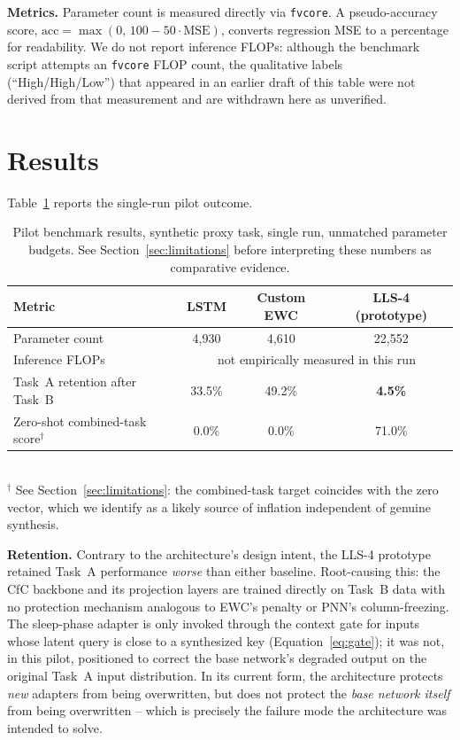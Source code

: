 \documentclass[11pt]{article}
\begin{document}
\textbf{Metrics.} Parameter count is measured directly via \texttt{fvcore}. A pseudo-accuracy score, $\mathrm{acc} = \max(0,\, 100 - 50 \cdot \mathrm{MSE})$, converts regression MSE to a percentage for readability. We do not report inference FLOPs: although the benchmark script attempts an \texttt{fvcore} FLOP count, the qualitative labels (``High/High/Low'') that appeared in an earlier draft of this table were not derived from that measurement and are withdrawn here as unverified.

\section{Results}
\label{sec:results}

Table~\ref{tab:results} reports the single-run pilot outcome.

\begin{table}[htbp]
\centering
\caption{Pilot benchmark results, synthetic proxy task, single run, unmatched parameter budgets. See Section~\ref{sec:limitations} before interpreting these numbers as comparative evidence.}
\label{tab:results}
\begin{tabular}{lccc}
\toprule
\textbf{Metric} & \textbf{LSTM} & \textbf{Custom EWC} & \textbf{LLS-4 (prototype)} \\
\midrule
Parameter count & 4{,}930 & 4{,}610 & 22{,}552 \\
Inference FLOPs & \multicolumn{3}{c}{not empirically measured in this run} \\
Task~A retention after Task~B & 33.5\% & 49.2\% & \textbf{4.5\%} \\
Zero-shot combined-task score$^{\dagger}$ & 0.0\% & 0.0\% & 71.0\% \\
\bottomrule
\end{tabular}
\\[4pt]
{\footnotesize $^{\dagger}$ See Section~\ref{sec:limitations}: the combined-task target coincides with the zero vector, which we identify as a likely source of inflation independent of genuine synthesis.}
\end{table}

\textbf{Retention.} Contrary to the architecture's design intent, the LLS-4 prototype retained Task~A performance \emph{worse} than either baseline. Root-causing this: the CfC backbone and its projection layers are trained directly on Task~B data with no protection mechanism analogous to EWC's penalty or PNN's column-freezing. The sleep-phase adapter is only invoked through the context gate for inputs whose latent query is close to a synthesized key (Equation~\ref{eq:gate}); it was not, in this pilot, positioned to correct the base network's degraded output on the original Task~A input distribution. In its current form, the architecture protects \emph{new} adapters from being overwritten, but does not protect the \emph{base network itself} from being overwritten -- which is precisely the failure mode the architecture was intended to solve.
\end{document}
